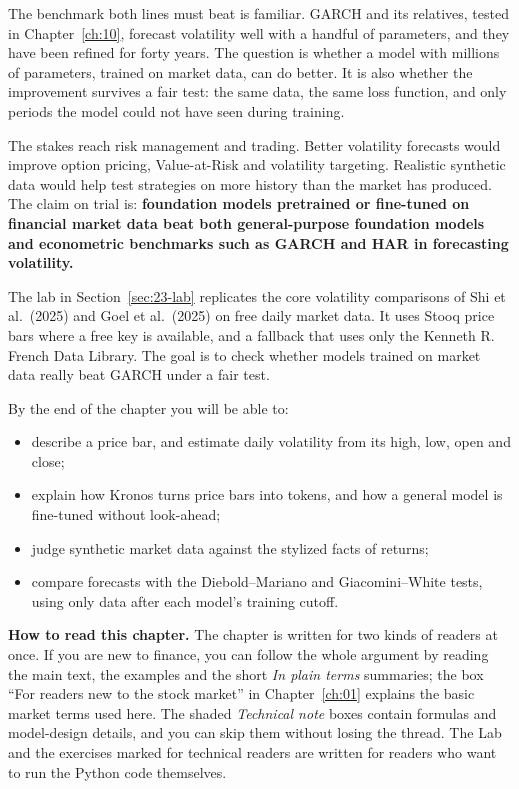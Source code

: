 The benchmark both lines must beat is familiar. GARCH and its relatives, tested in Chapter~\ref{ch:10}, forecast volatility well with a handful of parameters, and they have been refined for forty years. The question is whether a model with millions of parameters, trained on market data, can do better. It is also whether the improvement survives a fair test: the same data, the same loss function, and only periods the model could not have seen during training.

The stakes reach risk management and trading. Better volatility forecasts would improve option pricing, Value-at-Risk and volatility targeting. Realistic synthetic data would help test strategies on more history than the market has produced. The claim on trial is: \textbf{foundation models pretrained or fine-tuned on financial market data beat both general-purpose foundation models and econometric benchmarks such as GARCH and HAR in forecasting volatility.}

The lab in Section~\ref{sec:23-lab} replicates the core volatility comparisons of Shi et al.\ (2025) and Goel et al.\ (2025) on free daily market data. It uses Stooq price bars where a free key is available, and a fallback that uses only the Kenneth R. French Data Library. The goal is to check whether models trained on market data really beat GARCH under a fair test.

By the end of the chapter you will be able to:

\begin{itemize}
  \item describe a price bar, and estimate daily volatility from its high, low, open and close;
  \item explain how Kronos turns price bars into tokens, and how a general model is fine-tuned without look-ahead;
  \item judge synthetic market data against the stylized facts of returns;
  \item compare forecasts with the Diebold--Mariano and Giacomini--White tests, using only data after each model's training cutoff.
\end{itemize}

\begin{callout}
\textbf{How to read this chapter.} The chapter is written for two kinds of readers at once. If you are new to finance, you can follow the whole argument by reading the main text, the examples and the short \emph{In plain terms} summaries; the box ``For readers new to the stock market'' in Chapter~\ref{ch:01} explains the basic market terms used here. The shaded \emph{Technical note} boxes contain formulas and model-design details, and you can skip them without losing the thread. The Lab and the exercises marked for technical readers are written for readers who want to run the Python code themselves.
\end{callout}

